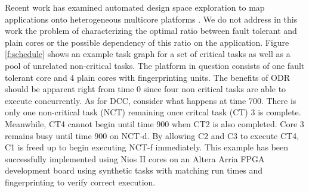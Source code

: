 	Recent work has examined automated design space exploration to map applications onto heterogeneous multicore platforms \cite{bolchini2013reliability,huang2014framework}. 
	We do not address in this work the problem of characterizing the optimal ratio between fault tolerant and plain cores or the possible dependency of this ratio on the application. 
	Figure \ref{f:schedule} shows an example task graph for a set of critical tasks as well as a pool of unrelated non-critical tasks.  
	The platform in question consists of one fault tolerant core and 4 plain cores with fingerprinting units. 
	The benefits of ODR should be apparent right from time 0 since four non critical tasks are able to execute concurrently. 
	As for DCC, consider what happens at time 700. There is only one non-critical task (NCT) remaining once critcal task (CT) 3 is complete. 
	Meanwhile, CT4 cannot begin until time 900 when CT2 is also completed. 
	Core 3 remains busy until time 900 on NCT-d. 
	By allowing C2 and C3 to execute CT4, C1 is freed up to begin executing NCT-f immediately. 
	This example has been successfully implemented using Nios II cores on an Altera Arria FPGA development board using synthetic tasks with matching run times and fingerprinting to verify correct execution.


